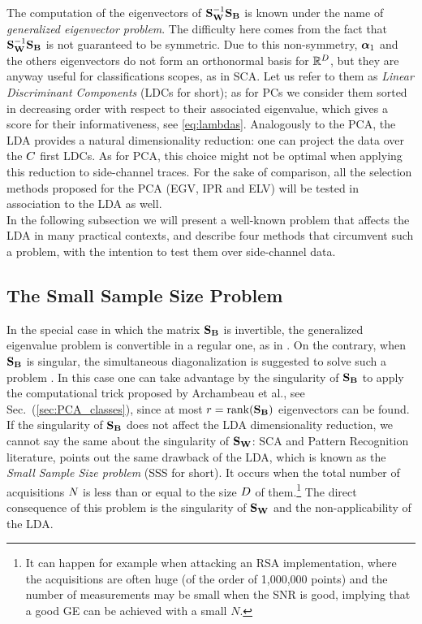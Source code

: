 The computation of the eigenvectors of $\SW^{-1} \SB$ is known under the name of {\em generalized eigenvector problem}. The difficulty here comes from the fact that $\SW^{-1} \SB$ is not guaranteed to be symmetric. Due to this non-symmetry,  $\AAlpha_1$ and the others eigenvectors do not form an orthonormal basis for $\mathbb{R}^\traceLength$, but they are anyway useful for classifications scopes, as in SCA. Let us refer to them as {\em Linear Discriminant Components} (LDCs for short); as for PCs we consider them sorted in decreasing order with respect to their associated eigenvalue, which gives a score for their informativeness, see \eqref{eq:lambdas}. Analogously to the PCA, the LDA provides a natural dimensionality reduction: one can project the data over the $\newTraceLength$ first  LDCs. As for PCA, this choice might not be optimal when applying this reduction to side-channel traces. For the sake of comparison, all the selection methods proposed for the PCA (EGV, IPR and ELV) will be tested in association to the LDA as well.\\

In the following subsection we will present a well-known problem that affects the LDA in many practical contexts, and describe four methods that circumvent such a problem, with the intention to test them over side-channel data.



\subsection{The Small Sample Size Problem}\label{sec:SSS}
In the special case in which the matrix $\SB$ is invertible, the generalized eigenvalue problem is convertible in a regular one, as in \cite{Standaert2008}. On the contrary, when $\SB$ is singular, the simultaneous diagonalization is suggested to solve such a problem \cite{Fukunaga}. In this case one can take advantage by the singularity of $\SB$ to apply the computational trick proposed by Archambeau et al., see Sec.~(\ref{sec:PCA_classes}), since at most $r = \mathrm{rank}(\SB)$ eigenvectors can be found.\\

If the singularity of $\SB$ does not affect the LDA dimensionality reduction, we cannot say the same about the singularity of $\SW$:  SCA and Pattern Recognition literature, points out the same drawback of the LDA, which is known as the {\em Small Sample Size problem} (SSS for short). It occurs when the total number of acquisitions $\numTraces[]$ is less than or equal to the size $\traceLength$ of them.\footnote{It can happen for example when attacking an RSA implementation, where the acquisitions are often huge (of the order of 1,000,000 points) and the number of measurements may be small when the SNR is good, implying that a good GE can be achieved with a small $N$.} The direct consequence of this problem is the singularity of $\SW$ and the non-applicability of the LDA. \\

